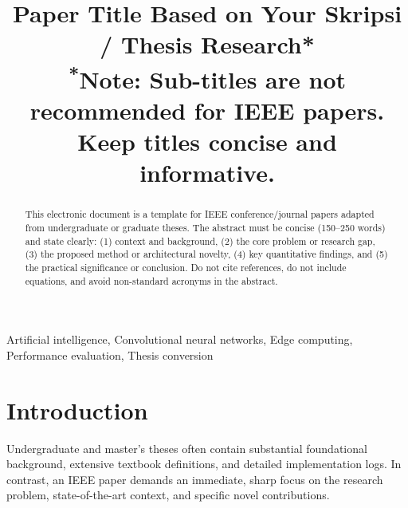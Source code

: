\documentclass[conference]{IEEEtran}
\begin{document}
\title{Paper Title Based on Your Skripsi / Thesis Research*\\
{\footnotesize \textsuperscript{*}Note: Sub-titles are not recommended for IEEE papers. Keep titles concise and informative.}
}

\author{
\and
{}
\and
{}
}

\maketitle

\begin{abstract}
This electronic document is a template for IEEE conference/journal papers adapted from undergraduate or graduate theses. The abstract must be concise (150--250 words) and state clearly: (1) context and background, (2) the core problem or research gap, (3) the proposed method or architectural novelty, (4) key quantitative findings, and (5) the practical significance or conclusion. Do not cite references, do not include equations, and avoid non-standard acronyms in the abstract.
\end{abstract}

\begin{IEEEkeywords}
Artificial intelligence, Convolutional neural networks, Edge computing, Performance evaluation, Thesis conversion
\end{IEEEkeywords}

\section{Introduction}
Undergraduate and master's theses often contain substantial foundational background, extensive textbook definitions, and detailed implementation logs. In contrast, an IEEE paper demands an immediate, sharp focus on the research problem, state-of-the-art context, and specific novel contributions.
\end{document}
